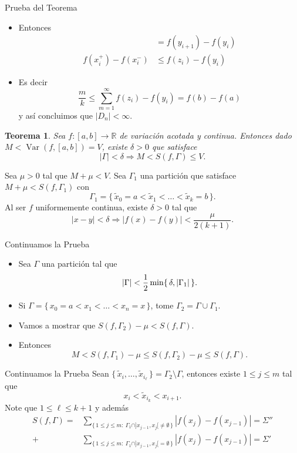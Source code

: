 \documentclass[utf8]{beamer}
\theoremstyle{plain}
\newtheorem{Th}{Teorema}               %
\theoremstyle{definition}
\theoremstyle{remark}
\numberwithin{equation}{section}
\newcommand{\dl}{\delta}                %
\newcommand{\Ga}{\Gamma}                %
\newcommand{\Sg}{\Sigma}                %
\newcommand{\bR}{\mathbb{R}}    %
\newcommand{\set}[1]{\{\,#1\,\}}    %
\renewcommand{\l}{\ell}                   %
\renewcommand{\leq}{\leqslant}          %
\newcommand{\less}{\setminus}           %
\newcommand{\To}{\Rightarrow}
\newcommand{\half}{{\mathchoice{\nhalf}{\thalf}{\shalf}{\shalf}}} %
\newcommand{\nhalf}{\frac{1}{2}}
\newcommand{\shalf}{{\scriptstyle\frac{1}{2}}} %
\newcommand{\thalf}{{\tfrac{1}{2}}} %
\newcommand{\sucm}{_{m=1}^\infty} %
\renewcommand{\.}{\Cdot}                %
\DeclareMathOperator{\Var}{Var}     %
\begin{document}
\begin{frame}{Prueba del Teorema}
 \begin{itemize}
   \item Entonces
   \begin{align*}
     &=f(y_{i+1})-f(y_i)\\
     f(x_i^+)-f(x_i^-)&\leq f(z_i)-f(y_i) %
   \end{align*}
   \item Es decir 
   $$\frac mk\leq \sum\sucm f(z_i)-f(y_i)=f(b)-f(a)$$
   y así concluimos que $|D_n|<\infty$.
 \end{itemize}
\end{frame}

\begin{frame}
  \begin{Th}\label{thm:lastHoy}
    Sea $f:[a,b]\to\bR$ de variación acotada y continua. Entonces dado $M<\Var(f,[a,b])=V$, existe $\dl>0$ que satisface
    $$|\Ga|<\dl\To M< S(f,\Ga)\leq V.$$
  \end{Th}
  Sea $\mu>0$ tal que $M+\mu<V$. Sea $\Ga_1$ una partición que satisface $M+\mu<S(f,\Ga_1)$ con 
  $$\Ga_1=\set{\tilde{x}_0=a<\tilde{x}_1<\dots<\tilde{x}_k=b}.$$
  Al ser $f$ uniformemente continua, existe $\dl>0$ tal que 
  $$|x-y|<\dl\To |f(x)-f(y)|<\frac{\mu}{2(k+1)}.$$
\end{frame}

\begin{frame}{Continuamos la Prueba}
  \begin{itemize}
    \item Sea $\Ga$ una partición tal que 
    $$|\Ga|<\half\min\set{\dl,|\Ga_1|}.$$
    \item Si $\Ga=\set{x_0=a<x_1<\dots<x_n=x}$, tome $\Ga_2=\Ga\cup\Ga_1$. 
  \item Vamos a mostrar que $S(f,\Ga_2)-\mu<S(f,\Ga)$. 
  \item Entonces
  $$M<S(f,\Ga_1)-\mu\leq S(f,\Ga_2)-\mu\leq S(f,\Ga).$$
\end{itemize}
\end{frame}

\begin{frame}{Continuamos la Prueba}
  Sean $\set{\tilde{x}_i,\dots,\tilde{x}_{i_\l}}=\Ga_2\less\Ga$, entonces existe $1\leq j\leq m$ tal que 
  $$x_i<\tilde{x}_{i_k}<x_{i+1}.$$
  Note que $1\leq \l\leq k+1$ y además
\begin{align*}
  S(f,\Ga)=&\sum_{\set{1\leq j\leq m:\ \Ga_1\cap]x_{j-1},x_j[\neq\emptyset}}|f(x_j)-f(x_{j-1})|=\Sg''\\
  +&\sum_{\set{1\leq j\leq m:\ \Ga_1\cap]x_{j-1},x_j[=\emptyset}}|f(x_j)-f(x_{j-1})|=\Sg'
\end{align*}
\end{frame}
\end{document}
